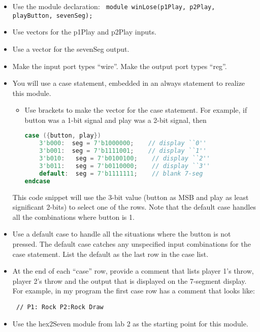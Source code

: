 \begin{itemize}
\item
  Use the module declaration:
\verb+ module winLose(p1Play, p2Play, playButton, sevenSeg);+

\item
  Use vectors for the p1Play and p2Play inputs.
\item
  Use a vector for the sevenSeg output.
\item
  Make the input port types ``wire''. Make the output port types  ``reg''.

\item
  You will use a case statement, embedded in an always statement to
  realize this module.

  \begin{itemize}
  \item
    Use brackets to make the vector for the case statement. For example,
    if button was a 1-bit signal and play was a 2-bit signal, then
    
\begin{lstlisting}[language=Verilog, frame=single]
case ({button, play})
    3'b000:  seg = 7'b1000000;    // display ``0''
    3'b001:  seg = 7'b1111001;    // display ``1''
    3'b010:   seg = 7'b0100100;    // display ``2''
    3'b011:   seg = 7'b0110000;    // display ``3''
    default:  seg = 7'b1111111;    // blank 7-seg
endcase
    \end{lstlisting}
    
  \end{itemize}

This code snippet will use the 3-bit value (button as MSB and play as
least significant 2-bits) to select one of the rows. Note that the
default case handles all the combinations where button is 1.

\item
  Use a default case to handle all the situations
  where the button is not pressed. The default case catches any
  unspecified input combinations for the case statement. List the
  default as the last row in the case list.
\item
  At the end of each ``case'' row, provide a comment that lists player
  1's throw, player 2's throw and the output that is displayed on the
  7-segment display. For example, in my program the first case row has a
  comment that looks like:

\verb+ // P1: Rock P2:Rock Draw +

\item
  Use the hex2Seven module from lab 2 as the starting point for this
  module.
\end{itemize}

